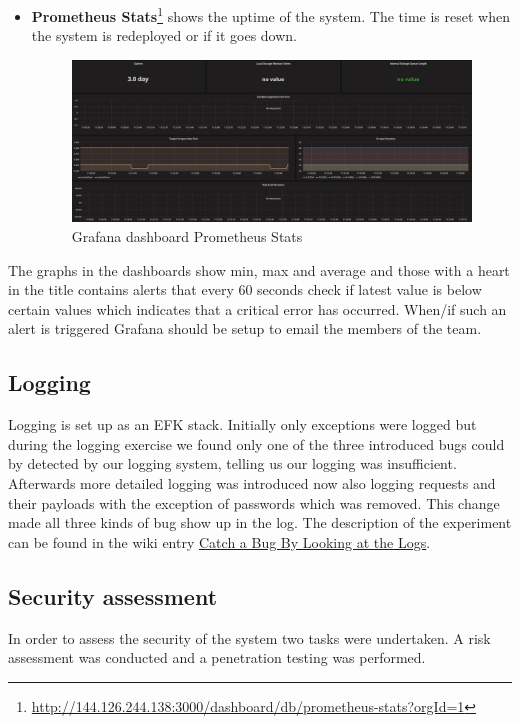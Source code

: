 \begin{itemize}
    \item \textbf{Prometheus Stats}\footnote{\url{http://144.126.244.138:3000/dashboard/db/prometheus-stats?orgId=1}} shows the uptime of the system. The time is reset when the system is redeployed or if it goes down.
    \begin{figure}[H]
        \centering
        \includegraphics[width=1.0\textwidth]{images/Grafana_prometheous_stats.JPG}
        \caption{Grafana dashboard Prometheus Stats}
        \label{fig:grafana_prometheus}
    \end{figure}
\end{itemize}
The graphs in the dashboards show min, max and average and those with a heart in the title contains alerts that every 60 seconds check if latest value is below certain values which indicates that a critical error has occurred. When/if such an alert is triggered Grafana should be setup to email the members of the team. 



\subsection{Logging}
Logging is set up as an EFK stack. Initially only exceptions were logged but during the logging exercise we found only one of the three introduced bugs could by detected by our logging system, telling us our logging was insufficient. Afterwards more detailed logging was introduced now also logging requests and their payloads with the exception of passwords which was removed. This change made all three kinds of bug show up in the log. The description of the experiment can be found in the wiki entry \underline{\href{https://github.com/DevOps2021-gb/devops2021/wiki/Catch-a-Bug-By-Looking-at-the-Logs}{Catch a Bug By Looking at the Logs}}. 


\subsection{Security assessment} %
In order to assess the security of the system two tasks were undertaken. A risk assessment was conducted and a penetration testing was performed.

